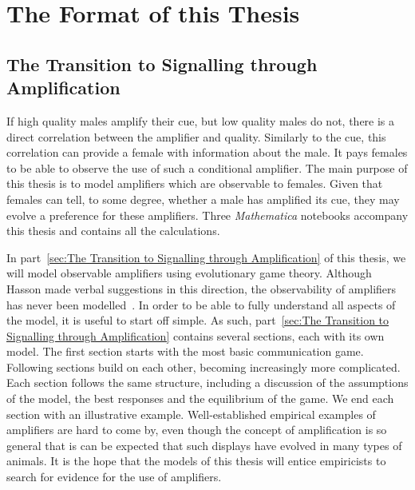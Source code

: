 \documentclass[a4paper,12pt]{article}
\numberwithin{equation}{section}
\begin{document}
\newpage \clearpage


\section{The Format of this Thesis}
\label{sec:Introduction/The Format of this Thesis}
\subsection{The Transition to Signalling through Amplification}
\label{sec:Introduction/The Transition to Signalling through Amplification}

If high quality males amplify their cue, but low quality males do not, there is a direct correlation between the amplifier and quality. Similarly to the cue, this correlation can provide a female with information about the male. It pays females to be able to observe the use of such a conditional amplifier. The main purpose of this thesis is to model amplifiers which are observable to females. Given that females can tell, to some degree, whether a male has amplified its cue, they may evolve a preference for these amplifiers. Three \textit{Mathematica} notebooks accompany this thesis and contains all the calculations.

In part~\ref{sec:The Transition to Signalling through Amplification} of this thesis, we will model observable amplifiers using evolutionary game theory. Although Hasson made verbal suggestions in this direction, the observability of amplifiers has never been modelled~\cite{Hasson1989}. In order to be able to fully understand all aspects of the model, it is useful to start off simple. As such, part~\ref{sec:The Transition to Signalling through Amplification} contains several sections, each with its own model. The first section starts with the most basic communication game. Following sections build on each other, becoming increasingly more complicated. Each section follows the same structure, including a discussion of the assumptions of the model, the best responses and the equilibrium of the game. We end each section with an illustrative example. Well-established empirical examples of amplifiers are hard to come by, even though the concept of amplification is so general that is can be expected that such displays have evolved in many types of animals. It is the hope that the models of this thesis will entice empiricists to search for evidence for the use of amplifiers.
\end{document}
